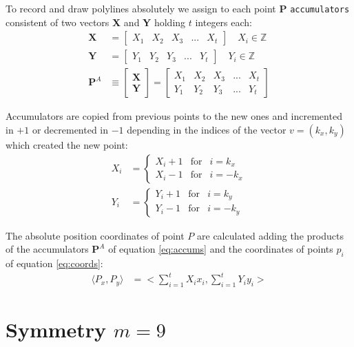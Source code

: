 \documentclass[11pt]{article}
\begin{document}
To record and draw polylines absolutely we assign to each point $\textbf{P}$ \texttt{accumulators} consistent of two vectors \textbf{X} and \textbf{Y} holding $t$ integers each:
\begin{align}
\textbf{X} &= \left[\begin{array}{ccccc}X_1&X_2&X_3&...&X_t
 \end{array}\right]  \quad X_i \in \mathbb{Z}\\
\textbf{Y} &= \left[\begin{array}{ccccc}Y_1&Y_2&Y_3&...&Y_t
 \end{array}\right]  \quad Y_i \in \mathbb{Z}\\
\textbf{P}^A &\equiv \left[\begin{array}{c}\textbf{X} \\ \textbf{Y}
 \end{array}\right]
 = \left[\begin{array}{ccccc}X_1&X_2&X_3&...&X_t
  \\ Y_1&Y_2&Y_3&...&Y_t \end{array}\right] \label{eq:accums}
\end{align}

Accumulators are copied from previous points to the new ones and incremented in $+1$ or decremented in $-1$ depending in the indices of the vector $v = (k_x,k_y)$ which created the new point:
\begin{align}
X_i &= \left\{ \begin{array}{ccl}
 X_i + 1 & \mbox{for} & i = k_x \\
 X_i - 1 & \mbox{for} & i = -k_x
 \end{array}\right. \\
Y_i &= \left\{ \begin{array}{ccl}
 Y_i + 1 & \mbox{for} & i = k_y \\
 Y_i - 1 & \mbox{for} & i = -k_y
 \end{array}\right.
\end{align}

The absolute position coordinates of point $P$ are calculated adding the products of the accumulators $\textbf{P}^A$ of equation \ref{eq:accums} and the coordinates of points $p_i$ of equation \ref{eq:coords}:
\begin{align}
\langle P_x,P_y\rangle &= 
 \biggl< \sum_{i=1}^{t}X_ix_i, \sum_{i=1}^{t}Y_iy_i \biggr> \label{eq:absolute}
\end{align}




\section{Symmetry $m=9$}
\end{document}
